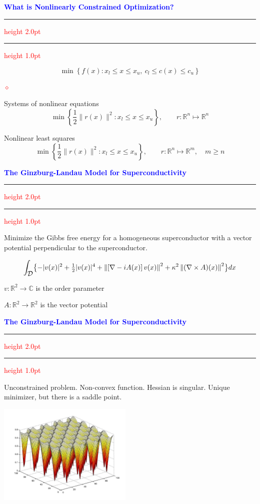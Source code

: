 \documentclass{seminar}
\newcommand{\R}{\mbox{${\mathbb R}$}}
\newcommand{\C}{\mbox{${\mathbb C}$}}
\newcommand{\grad}{\nabla}
\newcommand{\half}{{\textstyle{\frac{1}{2}}}}
\newcommand{\reddiamond}{\textcolor{red}{$\diamond$}}
\newcommand{\redstripe}{\textcolor{red}{\hrule height 2.0pt\hfil}
             \vspace{-1.8pt}
             \textcolor{red}{\hrule height 1.0pt\hfil}
}
\newcommand{\heading}[1]{%
   \centerline{\textcolor{blue}{\textbf{#1}}}%
    \redstripe%
    \bigskip
}
\newcommand{\cD} {\mbox{$\cal D$}}
\begin{document}
\begin{slide}

\heading{What is Nonlinearly Constrained Optimization?}

\[
\min \left \{ f(x): x_l \le x \le x_u , \ c_l \le c(x) \le c_u \right \}
\]

\medskip

\begin{list}{\reddiamond}
{
}
\item
Systems of nonlinear equations
\[
\min \left \{ \half \| r(x) \|^2 : x_l \le x \le x_u \right \} , \qquad
r : \R^n \mapsto \R^n
\]
\item
Nonlinear least squares
\[
\min \left \{ \half \| r(x) \|^2 : x_l \le x \le x_u \right \} , \qquad
r : \R^n \mapsto \R^m, \quad m \ge n
\]
\end{list}

\vfill

\end{slide}



\begin{slide}

\heading{The Ginzburg-Landau Model for Superconductivity}

Minimize the Gibbs free energy for a homogeneous superconductor with a vector
potential perpendicular to the superconductor.

{\small
\[
\int _ {\cD} \bigl \{ - | v (x) |^2 + \half | v (x) |^4  + 
\left \| \left [ \nabla - i A(x) \right ] v (x) \right \| ^2  +  \\
\kappa^2 \left \| ( \grad \times A ) (x) \right \| ^2 \bigr \} dx
\]
}

\medskip

\begin{center}
$ v : \R^2 \to \C$ is the order parameter

$A : \R^2 \to \R^2 $ is the vector potential
\end{center}

\vfill

\end{slide}

\begin{slide}

\heading{The Ginzburg-Landau Model for Superconductivity}

Unconstrained problem. Non-convex function. Hessian is singular.
Unique minimizer, but there is a saddle point.

\centerline {\includegraphics[height=1.9in]{../images/gl2}}

\end{slide}
\end{document}
